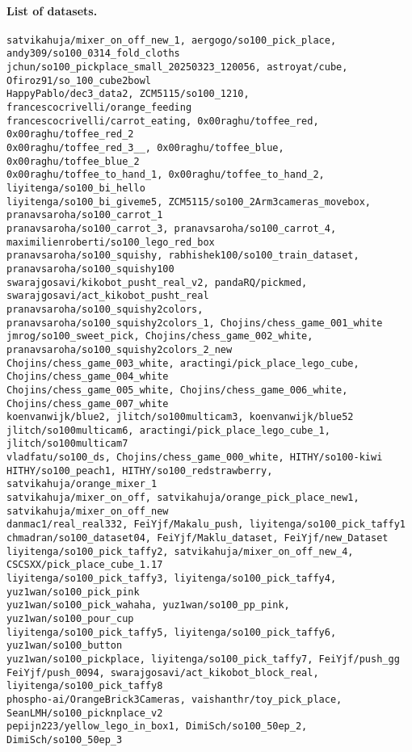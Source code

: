 \paragraph{List of datasets.}
\begin{verbatim}
satvikahuja/mixer_on_off_new_1, aergogo/so100_pick_place, andy309/so100_0314_fold_cloths
jchun/so100_pickplace_small_20250323_120056, astroyat/cube, Ofiroz91/so_100_cube2bowl
HappyPablo/dec3_data2, ZCM5115/so100_1210, francescocrivelli/orange_feeding
francescocrivelli/carrot_eating, 0x00raghu/toffee_red, 0x00raghu/toffee_red_2
0x00raghu/toffee_red_3__, 0x00raghu/toffee_blue, 0x00raghu/toffee_blue_2
0x00raghu/toffee_to_hand_1, 0x00raghu/toffee_to_hand_2, liyitenga/so100_bi_hello
liyitenga/so100_bi_giveme5, ZCM5115/so100_2Arm3cameras_movebox, pranavsaroha/so100_carrot_1
pranavsaroha/so100_carrot_3, pranavsaroha/so100_carrot_4, maximilienroberti/so100_lego_red_box
pranavsaroha/so100_squishy, rabhishek100/so100_train_dataset, pranavsaroha/so100_squishy100
swarajgosavi/kikobot_pusht_real_v2, pandaRQ/pickmed, swarajgosavi/act_kikobot_pusht_real
pranavsaroha/so100_squishy2colors, pranavsaroha/so100_squishy2colors_1, Chojins/chess_game_001_white
jmrog/so100_sweet_pick, Chojins/chess_game_002_white, pranavsaroha/so100_squishy2colors_2_new
Chojins/chess_game_003_white, aractingi/pick_place_lego_cube, Chojins/chess_game_004_white
Chojins/chess_game_005_white, Chojins/chess_game_006_white, Chojins/chess_game_007_white
koenvanwijk/blue2, jlitch/so100multicam3, koenvanwijk/blue52
jlitch/so100multicam6, aractingi/pick_place_lego_cube_1, jlitch/so100multicam7
vladfatu/so100_ds, Chojins/chess_game_000_white, HITHY/so100-kiwi
HITHY/so100_peach1, HITHY/so100_redstrawberry, satvikahuja/orange_mixer_1
satvikahuja/mixer_on_off, satvikahuja/orange_pick_place_new1, satvikahuja/mixer_on_off_new
danmac1/real_real332, FeiYjf/Makalu_push, liyitenga/so100_pick_taffy1
chmadran/so100_dataset04, FeiYjf/Maklu_dataset, FeiYjf/new_Dataset
liyitenga/so100_pick_taffy2, satvikahuja/mixer_on_off_new_4, CSCSXX/pick_place_cube_1.17
liyitenga/so100_pick_taffy3, liyitenga/so100_pick_taffy4, yuz1wan/so100_pick_pink
yuz1wan/so100_pick_wahaha, yuz1wan/so100_pp_pink, yuz1wan/so100_pour_cup
liyitenga/so100_pick_taffy5, liyitenga/so100_pick_taffy6, yuz1wan/so100_button
yuz1wan/so100_pickplace, liyitenga/so100_pick_taffy7, FeiYjf/push_gg
FeiYjf/push_0094, swarajgosavi/act_kikobot_block_real, liyitenga/so100_pick_taffy8
phospho-ai/OrangeBrick3Cameras, vaishanthr/toy_pick_place, SeanLMH/so100_picknplace_v2
pepijn223/yellow_lego_in_box1, DimiSch/so100_50ep_2, DimiSch/so100_50ep_3

\end{verbatim}
